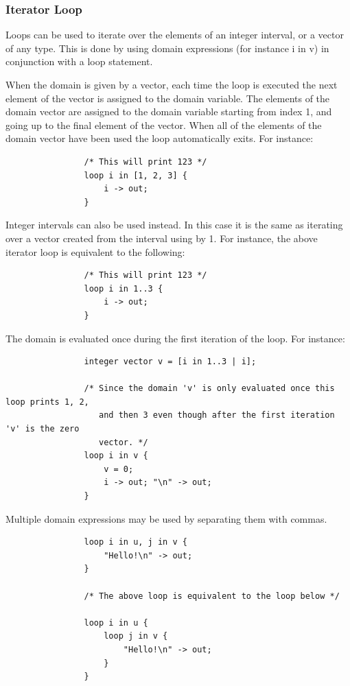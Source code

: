 \documentclass{article}
\begin{document}
		\subsubsection{Iterator Loop}\label{sec:iteratorLoop}

			Loops can be used to iterate over the elements of an integer interval, or a vector of any type. This is done
			by using domain expressions (for instance i in v) in conjunction with a loop statement.

			When the domain is given by a vector, each time the loop is executed the next element of the vector is
			assigned to the domain variable. The elements of the domain vector are assigned to the domain variable
			starting from index 1, and going up to the final element of the vector. When all of the elements of the
			domain vector have been used the loop automatically exits. For instance:

			\begin{lstlisting}
				/* This will print 123 */
				loop i in [1, 2, 3] {
					i -> out;
				}
			\end{lstlisting}

			Integer intervals can also be used instead. In this case it is the same as iterating over a vector created
			from the interval using by 1. For instance, the above iterator loop is equivalent to the following:

			\begin{lstlisting}
				/* This will print 123 */
				loop i in 1..3 {
					i -> out;
				}
			\end{lstlisting}

			The domain is evaluated once during the first iteration of the loop. For instance:

			\begin{lstlisting}
				integer vector v = [i in 1..3 | i];

				/* Since the domain 'v' is only evaluated once this loop prints 1, 2,
				   and then 3 even though after the first iteration 'v' is the zero
				   vector. */
				loop i in v {
					v = 0;
					i -> out; "\n" -> out;
				}
			\end{lstlisting}

			Multiple domain expressions may be used by separating them with commas.

			\begin{lstlisting}
				loop i in u, j in v {
					"Hello!\n" -> out;
				}

				/* The above loop is equivalent to the loop below */

				loop i in u {
					loop j in v {
						"Hello!\n" -> out;
					}
				}
			\end{lstlisting}
\end{document}
